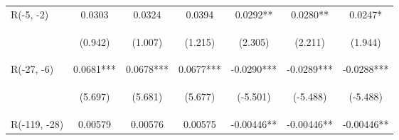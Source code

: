 \documentclass[]{standalone}
\begin{document}
\begin{tabular}{lcccccc}
    R(-5, -2)        & 0.0303                                         & 0.0324                                         & 0.0394                                         & 0.0292**                                       & 0.0280**                                       & 0.0247*                                        \\
    \vspace{4pt}     & \begin{footnotesize}(0.942)\end{footnotesize}  & \begin{footnotesize}(1.007)\end{footnotesize}  & \begin{footnotesize}(1.215)\end{footnotesize}  & \begin{footnotesize}(2.305)\end{footnotesize}  & \begin{footnotesize}(2.211)\end{footnotesize}  & \begin{footnotesize}(1.944)\end{footnotesize}  \\
    R(-27, -6)       & 0.0681***                                      & 0.0678***                                      & 0.0677***                                      & -0.0290***                                     & -0.0289***                                     & -0.0288***                                     \\
    \vspace{4pt}     & \begin{footnotesize}(5.697)\end{footnotesize}  & \begin{footnotesize}(5.681)\end{footnotesize}  & \begin{footnotesize}(5.677)\end{footnotesize}  & \begin{footnotesize}(-5.501)\end{footnotesize} & \begin{footnotesize}(-5.488)\end{footnotesize} & \begin{footnotesize}(-5.488)\end{footnotesize} \\
    R(-119, -28)     & 0.00579                                        & 0.00576                                        & 0.00575                                        & -0.00446**                                     & -0.00446**                                     & -0.00446**                                     \\

\end{tabular}
\end{document}
